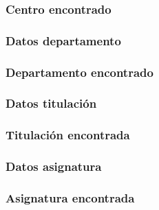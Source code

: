   

  \subsubsection{Centro encontrado}

  

  \subsubsection{Datos departamento}

  

  \subsubsection{Departamento encontrado}

  

  \subsubsection{Datos titulación}

  

  \subsubsection{Titulación encontrada}

  

  \subsubsection{Datos asignatura}

  

  \subsubsection{Asignatura encontrada}

